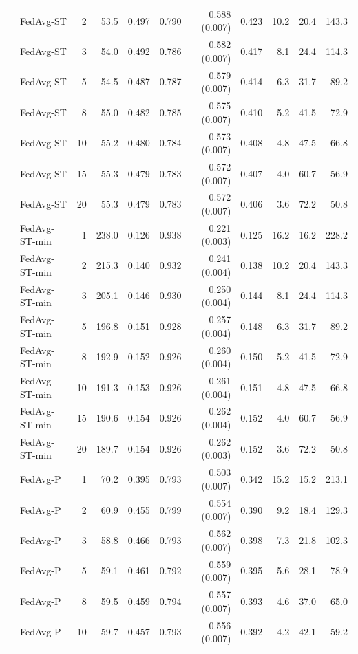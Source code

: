 \begin{longtable}{llrrrrrrrrr}
 & FedAvg-ST & 2 & 53.5 & 0.497 & 0.790 & 0.588 (0.007) & 0.423 & 10.2 & 20.4 & 143.3 \\
 & FedAvg-ST & 3 & 54.0 & 0.492 & 0.786 & 0.582 (0.007) & 0.417 & 8.1 & 24.4 & 114.3 \\
 & FedAvg-ST & 5 & 54.5 & 0.487 & 0.787 & 0.579 (0.007) & 0.414 & 6.3 & 31.7 & 89.2 \\
 & FedAvg-ST & 8 & 55.0 & 0.482 & 0.785 & 0.575 (0.007) & 0.410 & 5.2 & 41.5 & 72.9 \\
 & FedAvg-ST & 10 & 55.2 & 0.480 & 0.784 & 0.573 (0.007) & 0.408 & 4.8 & 47.5 & 66.8 \\
 & FedAvg-ST & 15 & 55.3 & 0.479 & 0.783 & 0.572 (0.007) & 0.407 & 4.0 & 60.7 & 56.9 \\
 & FedAvg-ST & 20 & 55.3 & 0.479 & 0.783 & 0.572 (0.007) & 0.406 & 3.6 & 72.2 & 50.8 \\
 & FedAvg-ST-min & 1 & 238.0 & 0.126 & 0.938 & 0.221 (0.003) & 0.125 & 16.2 & 16.2 & 228.2 \\
 & FedAvg-ST-min & 2 & 215.3 & 0.140 & 0.932 & 0.241 (0.004) & 0.138 & 10.2 & 20.4 & 143.3 \\
 & FedAvg-ST-min & 3 & 205.1 & 0.146 & 0.930 & 0.250 (0.004) & 0.144 & 8.1 & 24.4 & 114.3 \\
 & FedAvg-ST-min & 5 & 196.8 & 0.151 & 0.928 & 0.257 (0.004) & 0.148 & 6.3 & 31.7 & 89.2 \\
 & FedAvg-ST-min & 8 & 192.9 & 0.152 & 0.926 & 0.260 (0.004) & 0.150 & 5.2 & 41.5 & 72.9 \\
 & FedAvg-ST-min & 10 & 191.3 & 0.153 & 0.926 & 0.261 (0.004) & 0.151 & 4.8 & 47.5 & 66.8 \\
 & FedAvg-ST-min & 15 & 190.6 & 0.154 & 0.926 & 0.262 (0.004) & 0.152 & 4.0 & 60.7 & 56.9 \\
 & FedAvg-ST-min & 20 & 189.7 & 0.154 & 0.926 & 0.262 (0.003) & 0.152 & 3.6 & 72.2 & 50.8 \\
 & FedAvg-P & 1 & 70.2 & 0.395 & 0.793 & 0.503 (0.007) & 0.342 & 15.2 & 15.2 & 213.1 \\
 & FedAvg-P & 2 & 60.9 & 0.455 & 0.799 & 0.554 (0.007) & 0.390 & 9.2 & 18.4 & 129.3 \\
 & FedAvg-P & 3 & 58.8 & 0.466 & 0.793 & 0.562 (0.007) & 0.398 & 7.3 & 21.8 & 102.3 \\
 & FedAvg-P & 5 & 59.1 & 0.461 & 0.792 & 0.559 (0.007) & 0.395 & 5.6 & 28.1 & 78.9 \\
 & FedAvg-P & 8 & 59.5 & 0.459 & 0.794 & 0.557 (0.007) & 0.393 & 4.6 & 37.0 & 65.0 \\
 & FedAvg-P & 10 & 59.7 & 0.457 & 0.793 & 0.556 (0.007) & 0.392 & 4.2 & 42.1 & 59.2 \\

\end{longtable}
